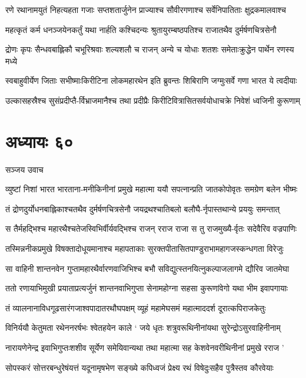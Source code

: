 \twolineshloka
{रणे रथानामयुतं निहत्यहता गजाः सप्तशतार्जुनेन}
{प्राज्याश्च सौवीरगणाश्च सर्वेनिपातिताः क्षुद्रकमालवाश्च}


\twolineshloka
{महत्कृतं कर्म धनञ्जयेनकर्तुं यथा नार्हति कश्चिदन्यः}
{श्रुतायुरम्बष्ठपतिश्च राजातथैव दुर्मर्षणचित्रसेनौ}


\twolineshloka
{द्रोणः कृपः सैन्धवबाह्लिकौ चभूरिश्रवाः शल्यशलौ च राजन्}
{अन्ये च योधाः शतशः समेताःक्रुद्धेन पार्थेन रणस्य मध्ये}


\twolineshloka
{स्वबाहुवीर्येण जिताः सभीष्माःकिरीटिना लोकमहारथेन}
{इति ब्रुवन्तः शिबिराणि जग्मुःसर्वे गणा भारत ये त्वदीयाः}


\twolineshloka
{उल्कासहस्रैश्च सुसंप्रदीप्तै-र्विभ्राजमानैश्च तथा प्रदीप्रैः}
{किरीटिवित्रासितसर्वयोधाचक्रे निवेशं ध्वजिनी कुरूणाम्}


\chapter{अध्यायः ६०}
\twolineshloka
{सञ्जय उवाच}
{}


\twolineshloka
{व्युष्टां निशां भारत भारताना-मनीकिनीनां प्रमुखे महात्मा}
{ययौ सपत्नान्प्रति जातकोपोवृतः समग्रेण बलेन भीष्मः}


\twolineshloka
{तं द्रोणदुर्योधनबाह्लिकाश्चतथैव दुर्मर्षणचित्रसेनौ}
{जयद्रथश्चातिबलो बलौघै-र्नृपास्तथान्ये प्रययुः समन्तात्}


\twolineshloka
{स तैर्महद्भिश्च महारथैश्चतेजस्विभिर्वीर्यवद्भिश्च राजन्}
{रराज राजा स तु राजमुख्यै-र्वृतः सदेवैरिव वज्रपाणिः}


\twolineshloka
{तस्मिन्ननीकप्रमुखे विषक्तादोधूयमानाश्च महापताकाः}
{सुरक्तपीतासितपाण्डुराभामहागजस्कन्धगता विरेजुः}


\twolineshloka
{सा वाहिनी शान्तनवेन गुप्तामहारथैर्वारणवाजिभिश्च}
{बभौ सविद्युत्स्तनयित्नुकल्पाजलागमे द्यौरिव जातमेघा}


\twolineshloka
{ततो रणायाभिमुखी प्रयाताप्रत्यर्जुनं शान्तनवाभिगुप्ता}
{सेनामहोग्ना सहसा कुरूणांवेगो यथा भीम इवापगायाः}


\twolineshloka
{तं व्यालनानाविधगूढसारंगजाश्वपादातरथौघपक्षम्}
{व्यूहं महामेघसमं महात्माददर्श दूरात्कपिराजकेतुः}


\twolineshloka
{विनिर्ययौ केतुमता रथेननरर्षभः श्वेतहयेन काले}
{` जये धृतः शत्रुवरूथिनीनांयथा सुरेन्द्रोऽसुरवाहिनीनाम्}


\twolineshloka
{नारायणेनेन्द्र इवाभिगुप्तःशशीव सूर्येण समेयिवान्यथा}
{तथा महात्मा सह केशवेनवरीथिनीनां प्रमुखे रराज '}


\twolineshloka
{सोपस्करं सोत्तरबन्धुरेषंयत्तं यदूनामृषभेण सङ्ख्ये}
{कपिध्वजं प्रेक्ष्य रथं विषेदुःसहैव पुत्रैस्तव कौरवेयाः}



